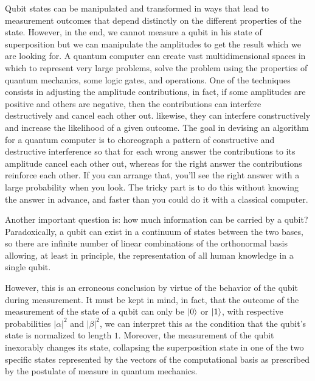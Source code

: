 Qubit states can be manipulated and transformed in ways that lead to measurement outcomes that depend distinctly on the different properties of the state. 
However, in the end, we cannot measure a qubit in his state of superposition but we can manipulate the amplitudes to get the result which we are looking for.
A quantum computer can create vast multidimensional spaces in which to represent very large problems, solve the problem using the properties of quantum mechanics, some logic gates, and operations. One of the techniques consists in adjusting the amplitude contributions, in fact, if some amplitudes are positive and others are negative, then the contributions can interfere destructively and cancel each other out. %
likewise, they can interfere constructively and increase the likelihood of a given outcome. The goal in devising an algorithm for a quantum computer is to choreograph a pattern of constructive and destructive interference so that for each wrong answer the contributions to its amplitude cancel each other out, whereas for the right answer the contributions reinforce each other. If you can arrange that, you’ll see the right answer with a large probability when you look. The tricky part is to do this without knowing the answer in advance, and faster than you could do it with a classical computer.



Another important question is: how much information can be carried by a qubit?
Paradoxically, a qubit can exist in a continuum of states between the two bases, so there are infinite number of linear combinations of the orthonormal basis allowing, at least in principle, the representation of all human knowledge in a single qubit.

However, this is an erroneous conclusion by virtue of the behavior of the qubit during measurement. It must be kept in mind, in fact, that the outcome of the measurement of the state of a qubit can only be $\ket{0}$ or $\ket{1}$, with respective probabilities $|\alpha|^2$ and $|\beta|^2$, we can interpret this as the condition that the qubit’s state is normalized to length $1$. 
Moreover, the measurement of the qubit inexorably changes its state, collapsing the superposition state in one of the two specific states represented by the vectors of the computational basis as prescribed by the postulate of measure in quantum mechanics.

